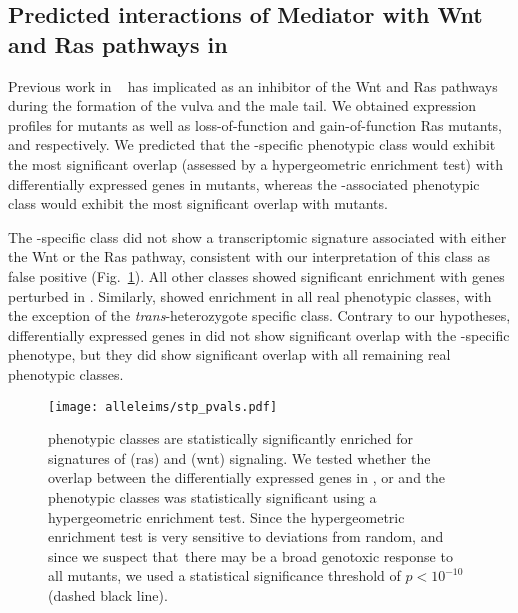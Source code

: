 \subsection*{Predicted interactions of Mediator with Wnt and Ras pathways in
          \cel{}}
Previous work in \cel{}~\citep{Moghal2003,Zhang2000} has implicated \dpy{} as an
inhibitor of the Wnt and Ras pathways during the formation of the vulva and the
male tail. We obtained expression profiles for  mutants as
well as loss-of-function and gain-of-function Ras mutants, 
and  respectively. We predicted that the \sy{}-specific
phenotypic class would exhibit the most significant overlap (assessed by a
hypergeometric enrichment test) with differentially expressed genes in
 mutants, whereas the \bx{}-associated phenotypic class
would exhibit the most significant overlap with  mutants.

The \bx{}-specific class did not show a transcriptomic signature associated with
either the Wnt or the Ras pathway, consistent with our interpretation of this
class as false positive (Fig.~\ref{fig:wnt_stps}). All other classes showed
significant enrichment with genes perturbed in . Similarly,
 showed enrichment in all real phenotypic classes, with the
exception of the \emph{trans}-heterozygote specific class. Contrary to our
hypotheses, differentially expressed genes in  did not
show significant overlap with the \sy{}-specific phenotype, but they did show
significant overlap with all remaining real phenotypic classes.

\begin{figure}
  \centering{}
  \texttt{[image: alleleims/stp\_pvals.pdf]}
  \caption{
          \dpy{} phenotypic classes are statistically significantly enriched
          for signatures of  (ras) and  (wnt)
          signaling.
          We tested whether the overlap between the differentially expressed
          genes in ,  or
           and the \dpy{} phenotypic classes was
          statistically significant using a hypergeometric enrichment test.
          Since the hypergeometric enrichment test is very sensitive to
          deviations from random, and since we suspect that there may be a broad
          genotoxic response to all mutants, we used a statistical significance
          threshold of $p < 10^{-10}$ (dashed black line).
  }
\label{fig:wnt_stps}
\end{figure}

